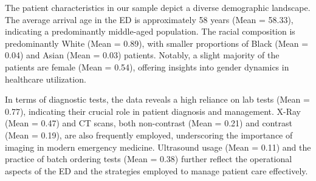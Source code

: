 \documentclass[,,nonblindrev]{informs}
\begin{document}
The patient characteristics in our sample depict a diverse demographic
landscape. The average arrival age in the ED is approximately 58 years
(Mean = 58.33), indicating a predominantly middle-aged population. The
racial composition is predominantly White (Mean = 0.89), with smaller
proportions of Black (Mean = 0.04) and Asian (Mean = 0.03) patients.
Notably, a slight majority of the patients are female (Mean = 0.54),
offering insights into gender dynamics in healthcare utilization.

In terms of diagnostic tests, the data reveals a high reliance on lab
tests (Mean = 0.77), indicating their crucial role in patient diagnosis
and management. X-Ray (Mean = 0.47) and CT scans, both non-contrast
(Mean = 0.21) and contrast (Mean = 0.19), are also frequently employed,
underscoring the importance of imaging in modern emergency medicine.
Ultrasound usage (Mean = 0.11) and the practice of batch ordering tests
(Mean = 0.38) further reflect the operational aspects of the ED and the
strategies employed to manage patient care effectively.
\end{document}
